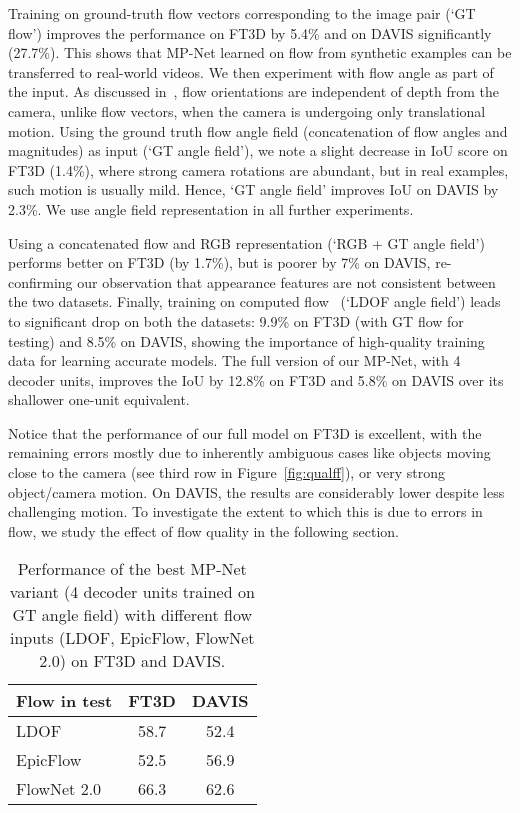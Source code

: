 Training on ground-truth flow vectors corresponding to the image pair (`GT
flow') improves the performance on FT3D by 5.4\% and on DAVIS significantly
(27.7\%). This shows that MP-Net learned on flow from synthetic examples can be
transferred to real-world videos. We then experiment with flow angle as part of
the input. As discussed in~\cite{Narayana13}, flow orientations are independent
of depth from the camera, unlike flow vectors, when the camera is undergoing
only translational motion. Using the ground truth flow angle field
(concatenation of flow angles and magnitudes) as input (`GT angle field'), we
note a slight decrease in IoU score on FT3D (1.4\%), where strong camera
rotations are abundant, but in real examples, such motion is usually mild.
Hence, `GT angle field' improves IoU on DAVIS by 2.3\%. We use angle field
representation in all further experiments.

Using a concatenated flow and RGB representation (`RGB + GT angle field')
performs better on FT3D (by 1.7\%), but is poorer by 7\% on DAVIS,
re-confirming our observation that appearance features are not consistent
between the two datasets. Finally, training on computed flow~\cite{Brox11a}
(`LDOF angle field') leads to significant drop on both the datasets: 9.9\% on
FT3D (with GT flow for testing) and 8.5\% on DAVIS, showing the importance of
high-quality training data for learning accurate models. The full version of
our MP-Net, with 4 decoder units, improves the IoU by 12.8\% on FT3D and 5.8\%
on DAVIS over its shallower one-unit equivalent.  

Notice that the performance of our full model on FT3D is excellent, with the
remaining errors mostly due to inherently ambiguous cases like objects moving
close to the camera (see third row in Figure~\ref{fig:qualff}), or very strong
object/camera motion. On DAVIS, the results are considerably lower despite less
challenging motion. To investigate the extent to which this is due to errors
in flow, we study the effect of flow quality in the following section. 
\begin{table}[t]
\begin{center}
\begin{tabular}{l|c|c}
\hline
Flow in test & FT3D & DAVIS \\
\hline
LDOF~\cite{sundaram2010dense}  & 58.7 & 52.4  \\
EpicFlow~\cite{Revaud15} & 52.5 & 56.9  \\
FlowNet 2.0~\cite{ilg2016flownet} & 66.3 & 62.6  \\
\hline
\end{tabular}
\caption{Performance of the best MP-Net variant (4 decoder units trained on GT
angle field) with different flow inputs (LDOF, EpicFlow, FlowNet 2.0) on FT3D
and DAVIS.}
\label{tbl:davis}
\end{center}
\end{table}

